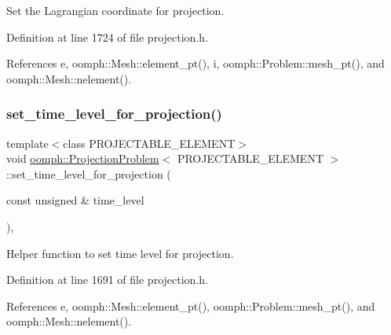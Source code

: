 Set the Lagrangian coordinate for projection. 



Definition at line 1724 of file projection.\+h.



References e, oomph\+::\+Mesh\+::element\+\_\+pt(), i, oomph\+::\+Problem\+::mesh\+\_\+pt(), and oomph\+::\+Mesh\+::nelement().

\mbox{\label{classoomph_1_1ProjectionProblem_a935983de617d4fb2feeef674af13d473}} 
\subsubsection{\texorpdfstring{set\+\_\+time\+\_\+level\+\_\+for\+\_\+projection()}{set\_time\_level\_for\_projection()}}
{\footnotesize\ttfamily template$<$class P\+R\+O\+J\+E\+C\+T\+A\+B\+L\+E\+\_\+\+E\+L\+E\+M\+E\+NT$>$ \\
void \hyperlink{classoomph_1_1ProjectionProblem}{oomph\+::\+Projection\+Problem}$<$ P\+R\+O\+J\+E\+C\+T\+A\+B\+L\+E\+\_\+\+E\+L\+E\+M\+E\+NT $>$\+::set\+\_\+time\+\_\+level\+\_\+for\+\_\+projection (\begin{DoxyParamCaption}\item[{const unsigned \&}]{time\+\_\+level }\end{DoxyParamCaption})\hspace{0.3cm}{\ttfamily [inline]}, {\ttfamily [private]}}



Helper function to set time level for projection. 



Definition at line 1691 of file projection.\+h.



References e, oomph\+::\+Mesh\+::element\+\_\+pt(), oomph\+::\+Problem\+::mesh\+\_\+pt(), and oomph\+::\+Mesh\+::nelement().

\mbox{\label{classoomph_1_1ProjectionProblem_a5518d9926a396536ea3d24a13e0a6a71}} 
